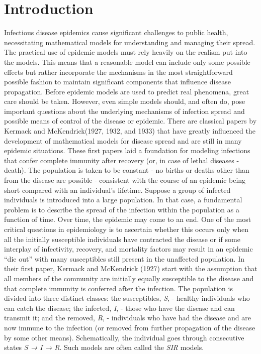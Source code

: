 \section{Introduction}\label{Introduction}\thispagestyle{SectionFirstPage} %
\hspace{\parindent} Infectious disease epidemics cause significant challenges to public health, necessitating mathematical models for understanding and managing their spread.
The practical use of epidemic models must rely heavily on the realism put into the models.
This means that a reasonable model can include only some possible effects but rather incorporate the mechanisms in the most straightforward possible fashion to maintain significant components that influence disease propagation.
Before epidemic models are used to predict real phenomena, great care should be taken.
However, even simple models should, and often do, pose important questions about the underlying mechanisms of infection spread and possible means of control of the disease or epidemic.
There are classical papers by Kermack and McKendrick(1927, 1932, and 1933) that have greatly influenced the development of mathematical models for disease spread and are still in many epidemic situations.
These first papers laid a foundation for modeling infections that confer complete immunity after recovery (or, in case of lethal diseases - death).
The population is taken to be constant - no births or deaths other than from the disease are possible - consistent with the course of an epidemic being short compared with an individual's lifetime.
Suppose a group of infected individuals is introduced into a large population. In that case, a fundamental problem is to describe the spread of the infection within the population as a function of time.
Over time, the epidemic may come to an end.
One of the most critical questions in epidemiology is to ascertain whether this occurs only when all the initially susceptible individuals have contracted the disease or if some interplay of infectivity, recovery, and mortality factors may result in an epidemic “die out” with many susceptibles still present in the unaffected population.
In their first paper, Kermack and McKendrick (1927) start with the assumption that all members of the community are initially equally susceptible to the disease and that complete immunity is conferred after the infection.
The population is divided into three distinct classes: the susceptibles, \textit{S}, - healthy individuals who can catch the disease; the infected, \textit{I}, - those who have the disease and can transmit it; and the removed, \textit{R}, - individuals who have had the disease and are now immune to the infection (or removed from further propagation of the disease by some other means).
Schematically, the individual goes through consecutive states \textit{S → I → R}.
Such models are often called the \textit{SIR} models.
